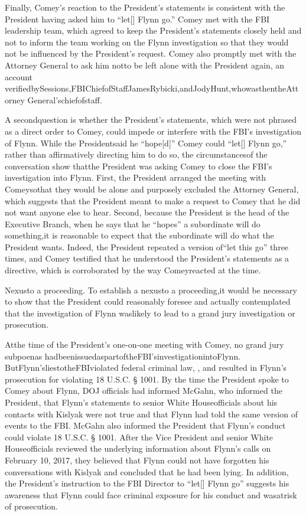 Finally, Comey’s reaction to the President’s statements is consistent with the President having asked him to “let[] Flynn go.” Comey met with the FBI leadership team, which agreed to keep the President’s statements closely held and not to inform the team working on the Flynn investigation so that they would not be influenced by the President’s request. Comey also promptly met with the Attorney General to ask him notto be left alone with the President again, an account verifiedbySessions,FBIChiefofStaffJamesRybicki,andJodyHunt,whowasthentheAttorney General’schiefofstaff.

A secondquestion is whether the President’s statements, which were not phrased as a direct order to Comey, could impede or interfere with the FBI’s investigation of Flynn. While the Presidentsaid he “hope[d]” Comey could “let[] Flynn go,” rather than affirmatively directing him to do so, the circumstancesof the conversation show thatthe President was asking Comey to close the FBI’s investigation into Flynn. First, the President arranged the meeting with Comeysothat they would be alone and purposely excluded the Attorney General, which suggests that the President meant to make a request to Comey that he did not want anyone else to hear. Second, because the President is the head of the Executive Branch, when he says that he “hopes” a subordinate will do something,it is reasonable to expect that the subordinate will do what the President wants. Indeed, the President repeated a version of“let this go” three times, and Comey testified that he understood the President’s statements as a directive, which is corroborated by the way Comeyreacted at the time.

Nexusto a proceeding. To establish a nexusto a proceeding,it would be necessary to show that the President could reasonably foresee and actually contemplated that the investigation of Flynn waslikely to lead to a grand jury investigation or prosecution.

Atthe time of the President’s one-on-one meeting with Comey, no grand jury subpoenas hadbeenissuedaspartoftheFBI’sinvestigationintoFlynn. ButFlynn’sliestotheFBIviolated federal criminal law, , and resulted in Flynn’s prosecution for violating 18 U.S.C. § 1001. By the time the President spoke to Comey about Flynn, DOJ officials had informed McGahn, who informed the President, that Flynn’s statements to senior White Houseofficials about his contacts with Kislyak were not true and that Flynn had told the same version of events to the FBI. McGahn also informed the President that Flynn’s conduct could violate 18 U.S.C. § 1001. After the Vice President and senior White Houseofficials reviewed the underlying information about Flynn’s calls on February 10, 2017, they believed that Flynn could not have forgotten his conversations with Kislyak and concluded that he had been
lying. In addition, the President’s instruction to the FBI Director to “let[] Flynn go” suggests his awareness that Flynn could face criminal exposure for his conduct and wasatrisk of prosecution.

